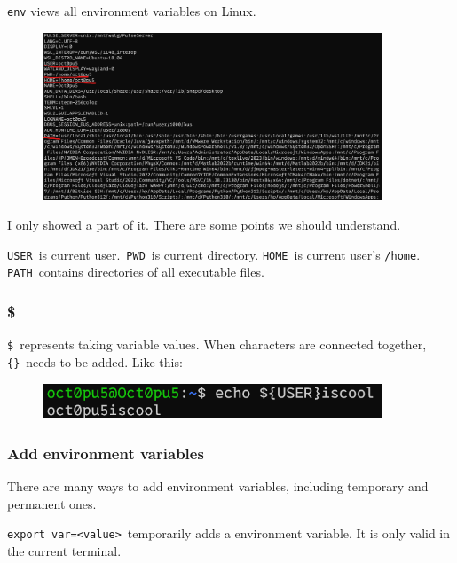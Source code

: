 \documentclass[12pt]{ctexart}
\begin{document}
\texttt{env} views all environment variables on Linux.

\begin{figure}[H]
    \centering
    \includegraphics[width=0.9\textwidth,keepaspectratio]{assets/Linux/1.11 Linux environment variables/1.png}
\end{figure}

I only showed a part of it. There are some points we should understand.

\texttt{USER}\ is current user.\ \texttt{PWD}\ is current directory.
\texttt{HOME}\ is current user's \texttt{/home}.
\texttt{PATH}\ contains directories of all executable files.

\subsubsection{\textbf{\$}}

\texttt{\$}\ represents taking variable values. When characters are
connected together, \texttt{\{\}}\ needs to be added. Like this:

\begin{figure}[H]
    \centering
    \includegraphics[width=0.9\textwidth,keepaspectratio]{assets/Linux/1.11 Linux environment variables/2.png}
\end{figure}

\subsubsection{\textbf{Add environment variables}}

There are many ways to add environment variables, including temporary
and permanent ones.

\texttt{export\ var=\textless{}value\textgreater{}}\ temporarily adds a
environment variable. It is only valid in the current terminal.
\end{document}
